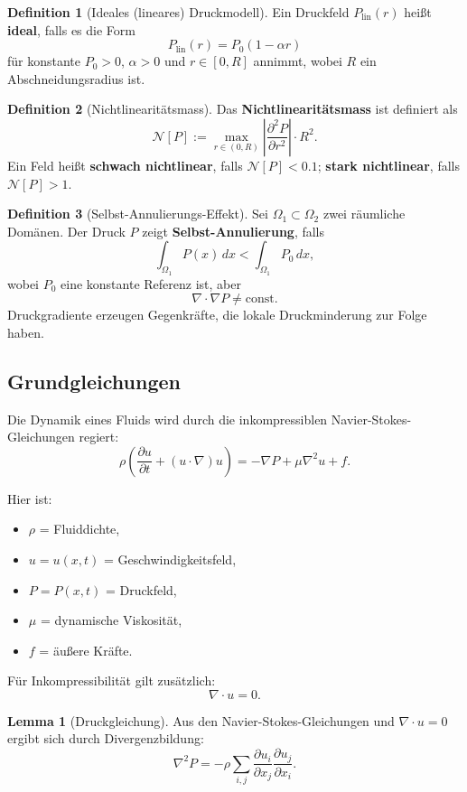 \documentclass[a4paper,12pt]{article}
\theoremstyle{definition}
\newtheorem{definition}{Definition}
\newtheorem{lemma}{Lemma}
\begin{document}
\begin{definition}[Ideales (lineares) Druckmodell]
Ein Druckfeld $P_{\text{lin}}(r)$ heißt \textbf{ideal}, falls es die Form
\[
P_{\text{lin}}(r) = P_0(1 - \alpha r)
\]
für konstante $P_0 > 0$, $\alpha > 0$ und $r \in [0, R]$ annimmt, wobei $R$ ein Abschneidungsradius ist.
\end{definition}

\begin{definition}[Nichtlinearitätsmass]
Das \textbf{Nichtlinearitätsmass} ist definiert als
\[
\mathcal{N}[P] := \max_{r \in (0,R)} \left| \frac{\partial^2 P}{\partial r^2} \right| \cdot R^2.
\]
Ein Feld heißt \textbf{schwach nichtlinear}, falls $\mathcal{N}[P] < 0.1$; \textbf{stark nichtlinear}, falls $\mathcal{N}[P] > 1$.
\end{definition}

\begin{definition}[Selbst-Annulierungs-Effekt]
Sei $\Omega_1 \subset \Omega_2$ zwei räumliche Domänen. Der Druck $P$ zeigt \textbf{Selbst-Annulierung}, falls
\[
\int_{\Omega_1} P(x) \, dx < \int_{\Omega_1} P_0 \, dx,
\]
wobei $P_0$ eine konstante Referenz ist, aber
\[
\nabla \cdot \nabla P \neq \text{const}.
\]
Druckgradiente erzeugen Gegenkräfte, die lokale Druckminderung zur Folge haben.
\end{definition}

\subsection{Grundgleichungen}

Die Dynamik eines Fluids wird durch die inkompressiblen Navier-Stokes-Gleichungen regiert:
\[
\rho \left( \frac{\partial u}{\partial t} + (u \cdot \nabla) u \right) = -\nabla P + \mu \nabla^2 u + f.
\]

Hier ist:
\begin{itemize}
	\item $\rho$ = Fluiddichte,
	\item $u = u(x,t)$ = Geschwindigkeitsfeld,
	\item $P = P(x,t)$ = Druckfeld,
	\item $\mu$ = dynamische Viskosität,
	\item $f$ = äußere Kräfte.
\end{itemize}

Für Inkompressibilität gilt zusätzlich:
\[
\nabla \cdot u = 0.
\]

\begin{lemma}[Druckgleichung]
Aus den Navier-Stokes-Gleichungen und $\nabla \cdot u = 0$ ergibt sich durch Divergenzbildung:
\[
\nabla^2 P = -\rho \sum_{i,j} \frac{\partial u_i}{\partial x_j} \frac{\partial u_j}{\partial x_i}.
\]
\end{lemma}
\end{document}
